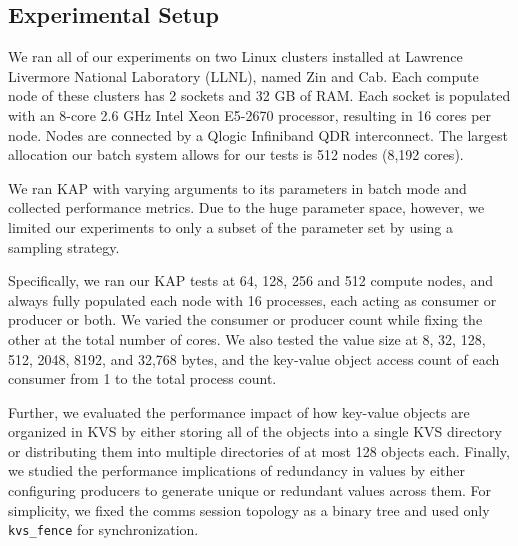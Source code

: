 \subsection{Experimental Setup}
We ran all of our experiments on two Linux clusters installed at 
Lawrence Livermore National Laboratory (LLNL),
named Zin and Cab.
Each compute node of these clusters has 2 sockets and 32 GB of RAM.
Each socket is populated with an 8-core 2.6 GHz Intel
Xeon E5-2670 processor, resulting in 16 cores per node.
Nodes are connected by a Qlogic Infiniband QDR interconnect.
The largest allocation our batch system allows for our tests is
512 nodes (8,192 cores).

We ran KAP with varying arguments to its parameters
in batch mode and collected 
performance metrics. 
Due to the huge parameter space, however, we limited our experiments to
only a subset of the parameter set by using a sampling strategy.

Specifically, we ran our KAP tests at 64, 128, 256 and 512
compute nodes, and always fully populated each node with
16 processes, each acting as consumer or producer or
both. We varied the consumer or producer count
while fixing the other at the total number of cores.
We also tested the value size at
8, 32, 128, 512, 2048, 8192, and 32,768 bytes,
and the key-value object access count of each consumer
from 1 to the total process count.

Further, we evaluated the performance impact 
of how key-value objects are organized 
in KVS by either storing all of the objects into a single KVS directory
or distributing them into multiple directories of at most 128 objects each.
Finally, we studied the performance implications of 
redundancy in values by either configuring producers to generate
unique or redundant values across them.
For simplicity, we fixed the comms session topology as a binary tree
and used only {\tt kvs\_fence} for synchronization.
